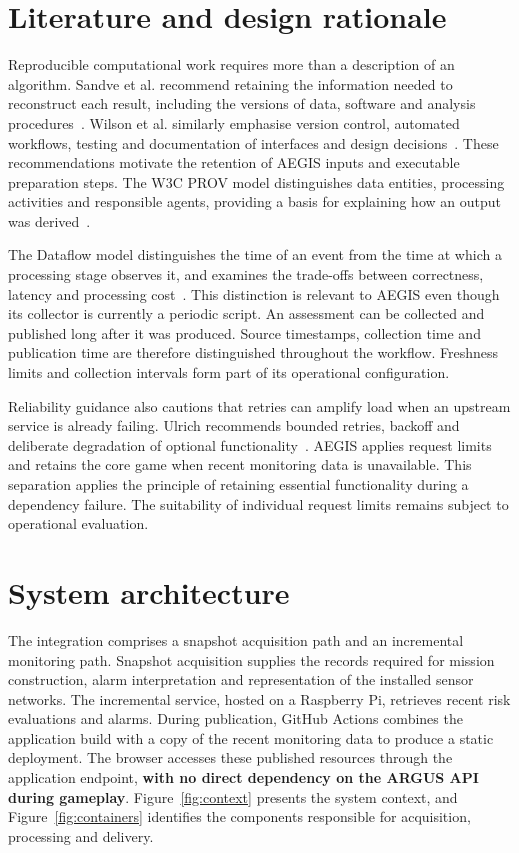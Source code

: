 \documentclass[10pt,a4paper]{article}
\begin{document}
\section{Literature and design rationale}
Reproducible computational work requires more than a description of an algorithm. Sandve et al. recommend retaining the information needed to reconstruct each result, including the versions of data, software and analysis procedures~\cite{sandve2013}. Wilson et al. similarly emphasise version control, automated workflows, testing and documentation of interfaces and design decisions~\cite{wilson2014}. These recommendations motivate the retention of AEGIS inputs and executable preparation steps. The W3C PROV model distinguishes data entities, processing activities and responsible agents, providing a basis for explaining how an output was derived~\cite{prov2013}.

The Dataflow model distinguishes the time of an event from the time at which a processing stage observes it, and examines the trade-offs between correctness, latency and processing cost~\cite{akidau2015}. This distinction is relevant to AEGIS even though its collector is currently a periodic script. An assessment can be collected and published long after it was produced. Source timestamps, collection time and publication time are therefore distinguished throughout the workflow. Freshness limits and collection intervals form part of its operational configuration.

Reliability guidance also cautions that retries can amplify load when an upstream service is already failing. Ulrich recommends bounded retries, backoff and deliberate degradation of optional functionality~\cite{ulrich2016}. AEGIS applies request limits and retains the core game when recent monitoring data is unavailable. This separation applies the principle of retaining essential functionality during a dependency failure. The suitability of individual request limits remains subject to operational evaluation.

\section{System architecture}
The integration comprises a snapshot acquisition path and an incremental monitoring path. Snapshot acquisition supplies the records required for mission construction, alarm interpretation and representation of the installed sensor networks. The incremental service, hosted on a Raspberry Pi, retrieves recent risk evaluations and alarms. During publication, GitHub Actions combines the application build with a copy of the recent monitoring data to produce a static deployment. The browser accesses these published resources through the application endpoint, \textbf{with no direct dependency on the ARGUS API during gameplay}. Figure~\ref{fig:context} presents the system context, and Figure~\ref{fig:containers} identifies the components responsible for acquisition, processing and delivery.
\end{document}
